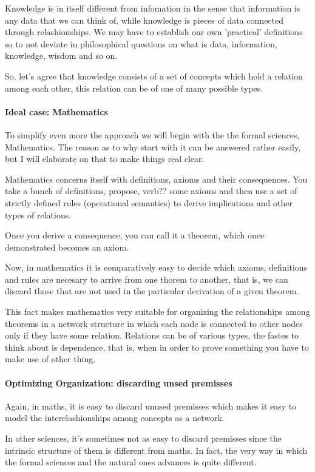 Knowledge is in itself different from  infomation in the sense
that information is any data that we can think of, while knowledge
is pieces of data connected through relashionships. We may have to 
establish our own 'practical' definitions so to not deviate
in philosophical questions on what is data, information, knowledge, 
wisdom and so on.

So, let's agree that knowledge consists of a set of concepts 
which hold a relation among each other, this relation can be
of one of many possible types.

\paragraph{Ideal case: Mathematics}
To simplify even more the approach we will begin with the 
the formal sciences, Mathematics. The reason as to why start
with it can be answered rather easily, but I will elaborate 
on that to make things real clear.

Mathematics concerns itself with definitions, axioms and their 
consequences. You take a bunch of definitions, propose, verb??
some axioms and then use a set of strictly defined rules (operational 
semantics) to derive implications and other types of relations.

Once you derive a consequence, you can call it a theorem, which 
once demonstrated becomes an axiom.

Now, in mathematics it is comparatively easy to decide which axioms, 
definitions and rules are necesary to arrive from one thorem to 
another, that is, we can discard those that are not used in the 
particular derivation of a given theorem.

This fact makes mathematics very suitable for organizing the relationships
among theorems in a network structure in which each node is connected
to other nodes only if they have some relation. Relations 
can be of various types, the fastes to think about is 
dependence, that is, when in order to prove something you 
have to make use of other thing.

\paragraph{Optimizing Organization: discarding unsed premisses}
Again, in maths, it is easy to discard unused premisses which makes it
easy to model the interelashionships among concepts as a network.

In other sciences, it's sometimes not as easy to discard premisses
since the intrinsic structure of them is different from maths.
In fact, the very way in which the formal sciences and the natural
ones advances is quite different.

